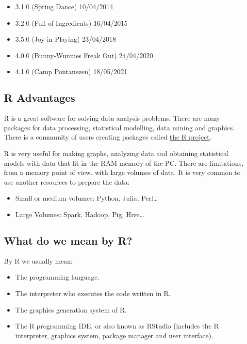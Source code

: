 \documentclass[
]{book}
\providecommand{\tightlist}{%
  \setlength{\itemsep}{0pt}\setlength{\parskip}{0pt}}
\theoremstyle{definition}
\theoremstyle{definition}
\theoremstyle{definition}
\theoremstyle{definition}
\theoremstyle{remark}
\begin{document}
\begin{itemize}
\tightlist
\item
  3.1.0 (Spring Dance) 10/04/2014
\item
  3.2.0 (Full of Ingredients) 16/04/2015
\item
  3.5.0 (Joy in Playing) 23/04/2018
\item
  4.0.0 (Bunny-Wunnies Freak Out) 24/04/2020
\item
  4.1.0 (Camp Pontanezen) 18/05/2021
\end{itemize}

\hypertarget{r-advantages}{%
\subsection{R Advantages}\label{r-advantages}}

R is a great software for solving data analysis problems. There are many packages for data processing, statistical modelling, data mining and graphics. There is a community of users creating packages called \href{https://www.r-project.org}{the R project}.

R is very useful for making graphs, analyzing data and obtaining statistical models with data that fit in the RAM memory of the PC. There are limitations, from a memory point of view, with large volumes of data. It is very common to use another resources to prepare the data:

\begin{itemize}
\tightlist
\item
  Small or medium volumes: Python, Julia, Perl\ldots{}
\item
  Large Volumes: Spark, Hadoop, Pig, Hive\ldots{}
\end{itemize}

\hypertarget{what-do-we-mean-by-r}{%
\subsection{What do we mean by R?}\label{what-do-we-mean-by-r}}

By R we usually mean:

\begin{itemize}
\tightlist
\item
  The programming language.
\item
  The interpreter who executes the code written in R.
\item
  The graphics generation system of R.
\item
  The R programming IDE, or also known as RStudio (includes the R interpreter, graphics system, package manager and user interface).
\end{itemize}
\end{document}
